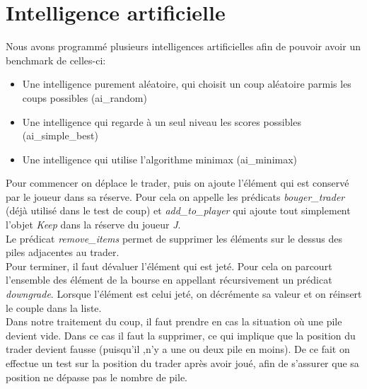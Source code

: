 \documentclass[11pt,a4paper,twoside,french,svgnames]{report}
\begin{document}
\section{Intelligence artificielle}
Nous avons programmé plusieurs intelligences artificielles afin de pouvoir avoir un benchmark de celles-ci:
\begin{itemize}
	\item Une intelligence purement aléatoire, qui choisit un coup aléatoire parmis les coups possibles (ai\_random)
    \item Une intelligence qui regarde à un seul niveau les scores possibles (ai\_simple\_best)
    \item Une intelligence qui utilise l'algorithme minimax (ai\_minimax)
\end{itemize}
Pour commencer on déplace le trader, puis on ajoute l'élément qui est conservé par le joueur dans sa réserve. Pour cela on appelle les prédicats \textit{bouger\_trader} (déjà utilisé dans le test de coup) et \textit{add\_to\_player} qui ajoute tout simplement l'objet \textit{Keep} dans la réserve du joueur \textit{J}. \\
Le prédicat \textit{remove\_items} permet de supprimer les éléments sur le dessus des piles adjacentes au trader.\\
Pour terminer, il faut dévaluer l'élément qui est jeté. Pour cela on parcourt l'ensemble des élément de la bourse en appellant récursivement un prédicat \textit{downgrade}. Lorsque l'élément est celui jeté, on décrémente sa valeur et on réinsert le couple dans la liste.\\
Dans notre traitement du coup, il faut prendre en cas la situation où une pile devient vide. Dans ce cas il faut la supprimer, ce qui implique que la position du trader devient fausse (puisqu'il ,n'y a une ou deux pile en moins). De ce fait on effectue un test sur la position du trader après avoir joué, afin de s'assurer que sa position ne dépasse pas le nombre de pile.
\end{document}
